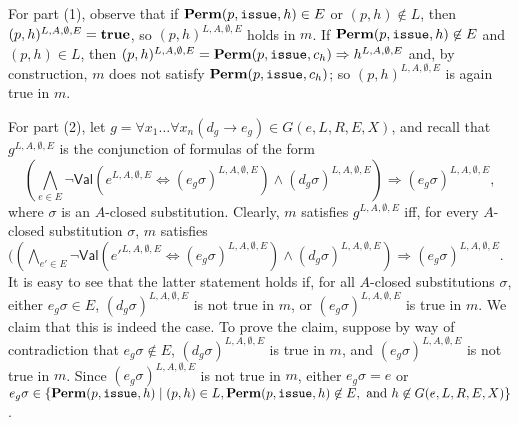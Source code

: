 \documentclass{acmtrans2m}
\newcommand{\rimp}{\Rightarrow}
\newcommand{\<}{
}
\renewcommand{\>}{\rangle}
\newcommand{\true}{\mathit{\bf{true}}}
\newcommand{\Permitted}{\mathit{\bf Perm}}
\newcommand{\cd}{d}
\newcommand{\cc}{e}
\newcommand{\scc}{E}
\newcommand{\issue}{\mathtt{issue}}
\newcommand{\imp}{\rightarrow}
\newcommand{\Eql}[2]{\mathsf{Val}(#1 \iff #2)}
\newcommand{\transwithE}[5]{#1^{#2, #3, #4, #5}}
\renewcommand{\iff}{\Leftrightarrow}
\newcommand{\EX}{X}
\begin{document}
\begin{sloppypar}
For part (1), observe that if $\Permitted(p, \issue, h)\in \scc$ or $(p,h)\not\in L$, then
$\transwithE{(p,h)}{L}{A}{\emptyset}{\scc} = \true$, so $\transwithE{(p,h)}{L}{A}{\emptyset}{\scc}$ holds
in $m$.  If $\Permitted(p, \issue, h)\not\in\scc$ and $(p, h)\in L$, then
$\transwithE{(p, h)}{L}{A}{\emptyset}{\scc} = \Permitted(p, \issue, c_h)\rimp\transwithE{h}{L}{A}{\emptyset}{\scc}$
and, by construction, $m$ does not satisfy $\Permitted(p, \issue, c_h)$; so
$\transwithE{(p, h)}{L}{A}{\emptyset}{\scc}$ is again true in $m$.

For part (2), let $g = \forall x_1 \ldots\forall x_n(\cd_g\imp\cc_g)\in G(\cc, L, R, \scc, \EX)$,
and recall that $\transwithE{g}{L}{A}{\emptyset}{\scc}$ is the conjunction of formulas of the form
$$
(\bigwedge_{\cc\in\scc}\neg\Eql{\transwithE{\cc}{L}{A}{\emptyset}{\scc}}
{\transwithE{(\cc_g\sigma)}{L}{A}{\emptyset}{\scc}}\land
\transwithE{(\cd_g\sigma)}{L}{A}{\emptyset}{\scc})\rimp\transwithE{(\cc_g\sigma)}{L}{A}{\emptyset}{\scc},
$$
where $\sigma$ is an $A$-closed substitution.  Clearly, $m$ satisfies
$\transwithE{g}{L}{A}{\emptyset}{\scc}$ iff, for every $A$-closed substitution $\sigma$, $m$
satisfies $((\bigwedge_{\cc'\in\scc}\neg\Eql{\transwithE{\cc'}{L}{A}{\emptyset}{\scc}}
{\transwithE{(\cc_g\sigma)}{L}{A}{\emptyset}{\scc}}\land
\transwithE{(\cd_g\sigma)}{L}{A}{\emptyset}{\scc})
\rimp\transwithE{(\cc_g\sigma)}{L}{A}{\emptyset}{\scc}$.
It is easy to see that the latter statement holds if, for all $A$-closed substitutions $\sigma$,
either $\cc_g\sigma\in\scc$, $\transwithE{(\cd_g\sigma)}{L}{A}{\emptyset}{\scc}$ is not true in $m$,
or $\transwithE{(\cc_g\sigma)}{L}{A}{\emptyset}{\scc}$ is true in $m$.  We claim that this is indeed
the case.  To prove the claim, suppose by way of contradiction that $\cc_g\sigma\not\in\scc$,
$\transwithE{(\cd_g\sigma)}{L}{A}{\emptyset}{\scc}$ is true in $m$, and
$\transwithE{(\cc_g\sigma)}{L}{A}{\emptyset}{\scc}$ is not true in $m$.
Since $\transwithE{(\cc_g\sigma)}{L}{A}{\emptyset}{\scc}$ is not true in $m$, either
$\cc_g\sigma = \cc$ or $\cc_g\sigma \in \{\Permitted(p, \issue, h) \mid (p, h)\in L,
\Permitted(p, \issue, h)\not\in\scc, \mbox{ and } h\not\in G(\cc, L, R, \scc, \EX)\}$.
\end{sloppypar}
\end{document}
